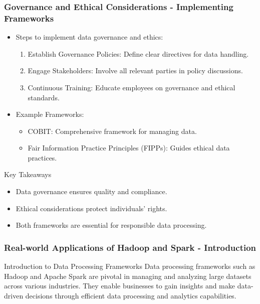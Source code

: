\documentclass{beamer}
\begin{document}
\begin{frame}[fragile]
    \frametitle{Governance and Ethical Considerations - Implementing Frameworks}
    \begin{itemize}
        \item Steps to implement data governance and ethics:
        \begin{enumerate}
            \item Establish Governance Policies: Define clear directives for data handling.
            \item Engage Stakeholders: Involve all relevant parties in policy discussions.
            \item Continuous Training: Educate employees on governance and ethical standards.
        \end{enumerate}
        \item Example Frameworks:
        \begin{itemize}
            \item COBIT: Comprehensive framework for managing data.
            \item Fair Information Practice Principles (FIPPs): Guides ethical data practices.
        \end{itemize}
    \end{itemize}
    
    \begin{block}{Key Takeaways}
        \begin{itemize}
            \item Data governance ensures quality and compliance.
            \item Ethical considerations protect individuals' rights.
            \item Both frameworks are essential for responsible data processing.
        \end{itemize}
    \end{block}
\end{frame}

\begin{frame}[fragile]
    \frametitle{Real-world Applications of Hadoop and Spark - Introduction}
    \begin{block}{Introduction to Data Processing Frameworks}
        Data processing frameworks such as Hadoop and Apache Spark are pivotal in managing and analyzing large datasets across various industries. They enable businesses to gain insights and make data-driven decisions through efficient data processing and analytics capabilities.
    \end{block}
\end{frame}
\end{document}
